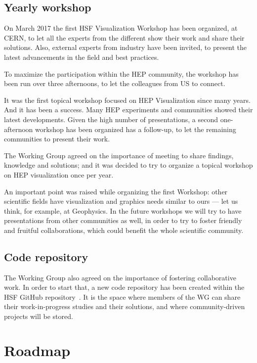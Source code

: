 \documentclass[12pt,a4paper]{article}
\begin{document}
\hypertarget{workshop}{%
\subsection{Yearly workshop}\label{workshop}}

On March 2017 the first HSF Visualization Workshop has been organized, at CERN, to let all the experts from the different
show their work and share their solutions. Also, external experts from industry have been invited, to present the latest
advancements in the field and best practices.

To maximize the participation within the HEP community, the workshop has been run over three afternoons, to let the
colleagues from US to connect.

It was the first topical workshop focused on HEP Visualization since many years. And it has been a success. Many HEP
experiments and communities showed their latest developments. Given the high number of presentations, a second one-afternoon
workshop has been organized has a follow-up, to let the remaining communities to present their work.

The Working Group agreed on the importance of meeting to share findings, knowledge and solutions; and it was decided to
try to organize a topical workshop on HEP visualization once per year.

An important point was raised while organizing the first Workshop: other scientific fields have visualization and
graphics needs similar to ours --- let us think, for example, at Geophysics. In the future workshops we will try to
have presentations from other communities as well, in order to try to foster friendly and fruitful collaborations,
which could benefit the whole scientific community.

\hypertarget{repo}{%
\subsection{Code repository}\label{repo}}

The Working Group also agreed on the importance of fostering collaborative work.
In order to start that, a new code repository has been created within the HSF GitHub repository~\cite{HSFVizRepo}.
It is the space where members of the WG can share their work-in-progress studies and their solutions, and where
community-driven projects will be stored.

\hypertarget{roadmap}{%
\section{Roadmap}\label{roadmap}}
\end{document}
